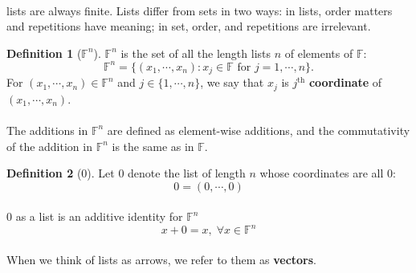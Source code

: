 \documentclass[paper=a4, fontsize=11pt]{scrartcl}
\numberwithin{equation}{section}		%
\numberwithin{figure}{section}			%
\numberwithin{table}{section}				%
\renewcommand{\th}{\ensuremath{\operatorname{th}}}
\theoremstyle{definition}
\newtheorem{definition}{Definition}[section]
\theoremstyle{remark}
\theoremstyle{example}
\begin{document}
\paragraph{}

lists are always finite. Lists differ from sets in two ways: in lists, order matters and repetitions have meaning; in set, order, and repetitions are irrelevant.

\begin{definition}[$\mathbb{F}^n$]
    $\mathbb{F}^n$ is the set of all the length lists $n$ of elements of $\mathbb{F}$:
    \begin{equation}
        \mathbb{F}^n = \{(x_1,\cdots,x_n):x_j\in \mathbb{F} \text{ for } j = 1, \cdots, n\}.
    \end{equation}
    For $(x_1, \cdots, x_n) \in \mathbb{F}^n$ and $j \in \{1, \cdots, n\}$, we say that $x_j$ is $j^{\th}$ \textbf{coordinate} of $(x_1, \cdots, x_n)$.
\end{definition}

\paragraph{}

The additions in $\mathbb{F}^n$ are defined as element-wise additions, and the commutativity of the addition in $\mathbb{F}^n$ is the same as in $\mathbb{F}$.

\begin{definition}[$0$]
    Let $0$ denote the list of length $n$ whose coordinates are all $0$:
    \begin{equation}
        0 = (0, \cdots, 0)
    \end{equation}
\end{definition}

\paragraph{}

$0$ as a list is an additive identity for $\mathbb{F}^n$
\begin{equation}
    x + 0 = x,\; \forall x \in \mathbb{F}^n
\end{equation}

\paragraph{}

When we think of lists as arrows, we refer to them as \textbf{vectors}.
\end{document}
